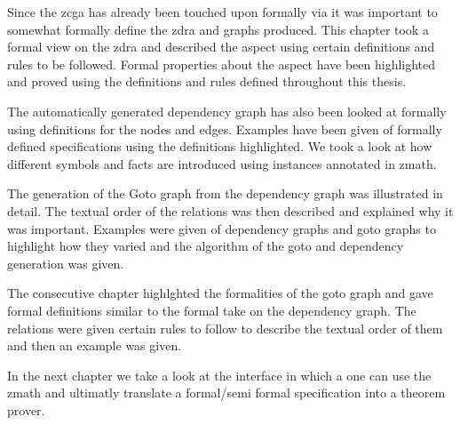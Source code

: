 Since the \gls{zcga} has already been touched upon formally via \cite{wtt} it was important to somewhat formally define the \gls{zdra} and graphs produced. This chapter took a formal view on the \gls{zdra} and described the aspect using certain definitions and rules to be followed. Formal properties about the aspect have been highlighted and proved using the definitions and rules defined throughout this thesis. 

The automatically generated dependency graph has also been looked at formally using definitions for the nodes and edges. Examples have been given of formally defined specifications using the definitions highlighted. We took a look at how different symbols and facts are introduced using instances annotated in \gls{zmath}.

The generation of the Goto graph from the dependency graph was illustrated in detail. The textual order of the relations was then described and explained why it was important. Examples were given of dependency graphs and goto graphs to highlight how they varied and the algorithm of the goto and dependency generation was given.

The consecutive chapter highlghted the formalities of the goto graph and gave formal definitions similar to the formal take on the dependency graph. The relations were given certain rules to follow to describe the textual order of them and then an example was given. 

In the next chapter we take a look at the interface in which a one can use the \gls{zmath} and ultimatly translate a formal/semi formal specification into a theorem prover.


